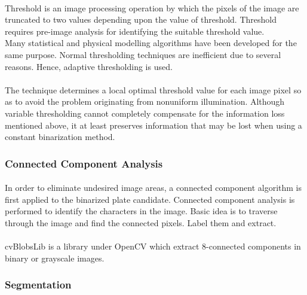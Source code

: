 \documentclass[a4paper,10pt]{iesreport}
\begin{document}
\paragraph*{}
Threshold is an image processing operation by which the
 pixels of the image are truncated to two values depending
 upon the value of threshold.
 Threshold requires pre-image analysis for identifying the
 suitable threshold value.
 \\
Many statistical and physical modelling algorithms have been
developed for the same purpose. Normal thresholding
techniques are inefficient due to several reasons. Hence,
adaptive thresholding is used.
\paragraph*{}
The technique determines a local optimal threshold value for each image pixel
 so as to avoid the problem originating from nonuniform illumination. Although variable thresholding cannot completely compensate for the information loss mentioned above, it at least
preserves information that may be lost when using a constant binarization method. 

\subsubsection{Connected Component Analysis}
\paragraph*{}
In order to eliminate undesired image areas, a connected component algorithm is first applied to the binarized plate candidate.
 Connected component analysis is performed to identify the characters in the image. Basic idea is to traverse through the image and find the connected pixels. Label them and extract. 
\paragraph*{}
cvBlobsLib is a library under OpenCV which extract 8-connected components in binary or grayscale images. 
\paragraph*{}

\subsubsection{Segmentation}
\end{document}
